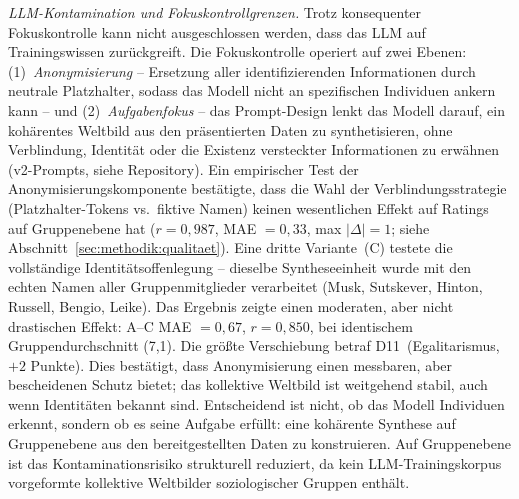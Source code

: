 \documentclass[12pt,a4paper]{article}
\begin{document}
\emph{LLM-Kontamination und Fokuskontrollgrenzen.} Trotz konsequenter Fokuskontrolle kann nicht ausgeschlossen werden, dass das LLM auf Trainingswissen zur\"uckgreift. Die Fokuskontrolle operiert auf zwei Ebenen: (1)~\emph{Anonymisierung} -- Ersetzung aller identifizierenden Informationen durch neutrale Platzhalter, sodass das Modell nicht an spezifischen Individuen ankern kann -- und (2)~\emph{Aufgabenfokus} -- das Prompt-Design lenkt das Modell darauf, ein koh\"arentes Weltbild aus den pr\"asentierten Daten zu synthetisieren, ohne Verblindung, Identit\"at oder die Existenz versteckter Informationen zu erw\"ahnen (v2-Prompts, siehe Repository). Ein empirischer Test der Anonymisierungskomponente best\"atigte, dass die Wahl der Verblindungsstrategie (Platzhalter-Tokens vs.\ fiktive Namen) keinen wesentlichen Effekt auf Ratings auf Gruppenebene hat ($r = 0{,}987$, MAE $= 0{,}33$, max $|\Delta| = 1$; siehe Abschnitt~\ref{sec:methodik:qualitaet}). Eine dritte Variante~(C) testete die vollst\"andige Identit\"atsoffenlegung -- dieselbe Syntheseeinheit wurde mit den echten Namen aller Gruppenmitglieder verarbeitet (Musk, Sutskever, Hinton, Russell, Bengio, Leike). Das Ergebnis zeigte einen moderaten, aber nicht drastischen Effekt: A--C MAE $= 0{,}67$, $r = 0{,}850$, bei identischem Gruppendurchschnitt (7,1). Die gr\"o\ss{}te Verschiebung betraf D11~(Egalitarismus, $+2$ Punkte). Dies best\"atigt, dass Anonymisierung einen messbaren, aber bescheidenen Schutz bietet; das kollektive Weltbild ist weitgehend stabil, auch wenn Identit\"aten bekannt sind. Entscheidend ist nicht, ob das Modell Individuen erkennt, sondern ob es seine Aufgabe erf\"ullt: eine koh\"arente Synthese auf Gruppenebene aus den bereitgestellten Daten zu konstruieren. Auf Gruppenebene ist das Kontaminationsrisiko strukturell reduziert, da kein LLM-Trainingskorpus vorgeformte kollektive Weltbilder soziologischer Gruppen enth\"alt.
\end{document}
